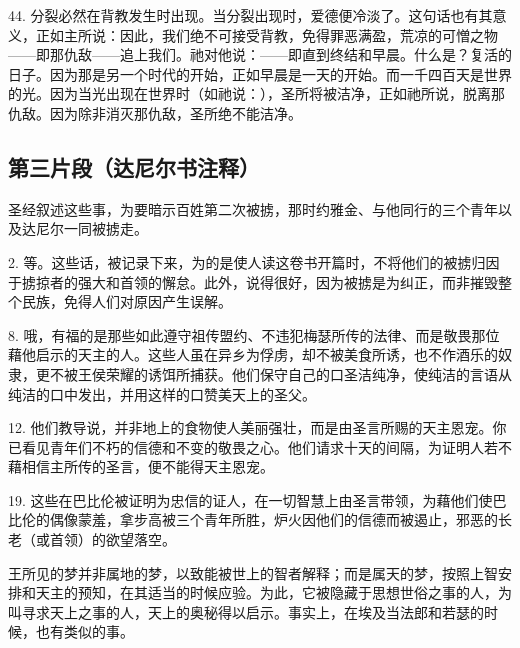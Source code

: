 44. 分裂必然在背教发生时出现。当分裂出现时，爱德便冷淡了。这句话也有其意义，正如主所说：因此，我们绝不可接受背教，免得罪恶满盈，荒凉的可憎之物——即那仇敌——追上我们。祂对他说：——即直到终结和早晨。什么是？复活的日子。因为那是另一个时代的开始，正如早晨是一天的开始。而一千四百天是世界的光。因为当光出现在世界时（如祂说：），圣所将被洁净，正如祂所说，脱离那仇敌。因为除非消灭那仇敌，圣所绝不能洁净。\par


\subsection{第三片段（达尼尔书注释）}

 圣经叙述这些事，为要暗示百姓第二次被掳，那时约雅金、与他同行的三个青年以及达尼尔一同被掳走。\par

2. 等。这些话，被记录下来，为的是使人读这卷书开篇时，不将他们的被掳归因于掳掠者的强大和首领的懈怠。此外，说得很好，因为被掳是为纠正，而非摧毁整个民族，免得人们对原因产生误解。\par

8. 哦，有福的是那些如此遵守祖传盟约、不违犯梅瑟所传的法律、而是敬畏那位藉他启示的天主的人。这些人虽在异乡为俘虏，却不被美食所诱，也不作酒乐的奴隶，更不被王侯荣耀的诱饵所捕获。他们保守自己的口圣洁纯净，使纯洁的言语从纯洁的口中发出，并用这样的口赞美天上的圣父。\par

12. 他们教导说，并非地上的食物使人美丽强壮，而是由圣言所赐的天主恩宠。你已看见青年们不朽的信德和不变的敬畏之心。他们请求十天的间隔，为证明人若不藉相信主所传的圣言，便不能得天主恩宠。\par

19. 这些在巴比伦被证明为忠信的证人，在一切智慧上由圣言带领，为藉他们使巴比伦的偶像蒙羞，拿步高被三个青年所胜，炉火因他们的信德而被遏止，邪恶的长老（或首领）的欲望落空。\par

 王所见的梦并非属地的梦，以致能被世上的智者解释；而是属天的梦，按照上智安排和天主的预知，在其适当的时候应验。为此，它被隐藏于思想世俗之事的人，为叫寻求天上之事的人，天上的奥秘得以启示。事实上，在埃及当法郎和若瑟的时候，也有类似的事。\par

